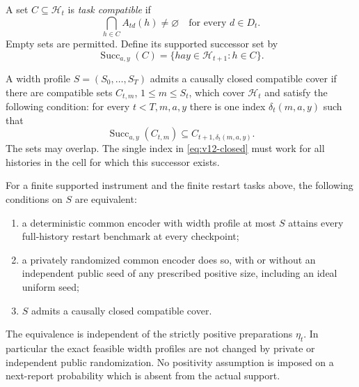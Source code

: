 A set $C\subseteq\mathcal H_t$ is \emph{task compatible} if
\begin{equation}
 \bigcap_{h\in C}A_{td}(h)\ne\varnothing
       \quad\text{for every }d\in D_t.
 \label{eq:v12-compatible}
\end{equation}
Empty sets are permitted. Define its supported successor set by
\[
 \operatorname{Succ}_{a,y}(C)
   =\{hay\in\mathcal H_{t+1}:h\in C\}.
\]

\begin{definition}
\label{def:v12-cover}
A width profile $S=(S_0,\ldots,S_T)$ admits a causally closed compatible
cover if there are compatible sets $C_{t,m}$, $1\le m\le S_t$, which cover
$\mathcal H_t$ and satisfy the following condition: for every $t<T,m,a,y$
there is one index $\delta_t(m,a,y)$ such that
\begin{equation}
 \operatorname{Succ}_{a,y}(C_{t,m})
       \subseteq C_{t+1,\delta_t(m,a,y)}.
 \label{eq:v12-closed}
\end{equation}
The sets may overlap. The single index in \eqref{eq:v12-closed} must work
for all histories in the cell for which this successor exists.
\end{definition}

\begin{theorem}
\label{thm:v12-support}
For a finite supported instrument and the finite restart tasks above, the
following conditions on $S$ are equivalent:
\begin{enumerate}
\item a deterministic common encoder with width profile at most $S$
attains every full-history restart benchmark at every checkpoint;
\item a privately randomized common encoder does so, with or without
an independent public seed of any prescribed positive size, including an
ideal uniform seed;
\item $S$ admits a causally closed compatible cover.
\end{enumerate}
The equivalence is independent of the strictly positive preparations
$\eta_t$. In particular the exact feasible width profiles are not changed
by private or independent public randomization. No positivity assumption
is imposed on a next-report probability which is absent from the actual
support.
\end{theorem}

